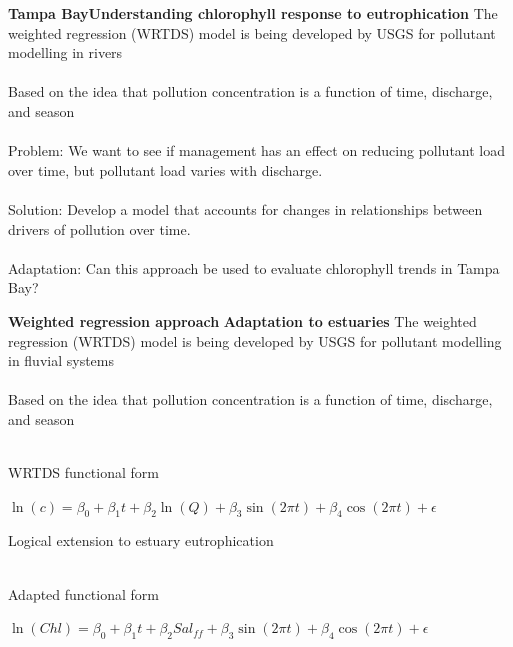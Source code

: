 \documentclass[serif]{beamer}\usepackage[]{graphicx}\usepackage[]{color}
\begin{document}
\begin{frame}{\textbf{Tampa Bay}}{\textbf{Understanding chlorophyll response to eutrophication}}
The \alert{weighted regression (WRTDS)} model is being developed by USGS for pollutant modelling in rivers \cite{Hirsch10}\\~\\
Based on the idea that pollution concentration is a function of \alert{time}, \alert{discharge}, and \alert{season}\\~\\
\alert{Problem:} We want to see if management has an effect on reducing pollutant load over time, but pollutant load varies with discharge.\\~\\
\alert{Solution:} Develop a model that accounts for changes in relationships between drivers of pollution over time.\\~\\
\alert{Adaptation:} Can this approach be used to evaluate chlorophyll trends in Tampa Bay?
\end{frame}

\begin{frame}{\textbf{Weighted regression approach}}{\textbf{ Adaptation to estuaries}}
The \alert{weighted regression (WRTDS)} model is being developed by USGS for pollutant modelling in fluvial systems \cite{Hirsch10}\\~\\
Based on the idea that pollution concentration is a function of \alert{time}, \alert{discharge}, and \alert{season}\\~\\
\begin{block}{WRTDS functional form}
\centerline{\textbf{$
\ln\left(c\right) = \beta_0 + \beta_1 t + \beta_2 \ln\left(Q\right) + \beta_3 \sin\left(2\pi t\right) + \beta_4 \cos\left(2\pi t\right) + \epsilon $
}}
\end{block}
\vspace{0.1in}
Logical extension to estuary eutrophication\\~\\
\begin{block}{Adapted functional form}
\centerline{\textbf{$
\ln\left(Chl\right) = \beta_0 + \beta_1 t + \beta_2 Sal_{ff} + \beta_3 \sin\left(2\pi t\right) + \beta_4 \cos\left(2\pi t\right) + \epsilon $
}}
\end{block}
\end{frame}
\end{document}
